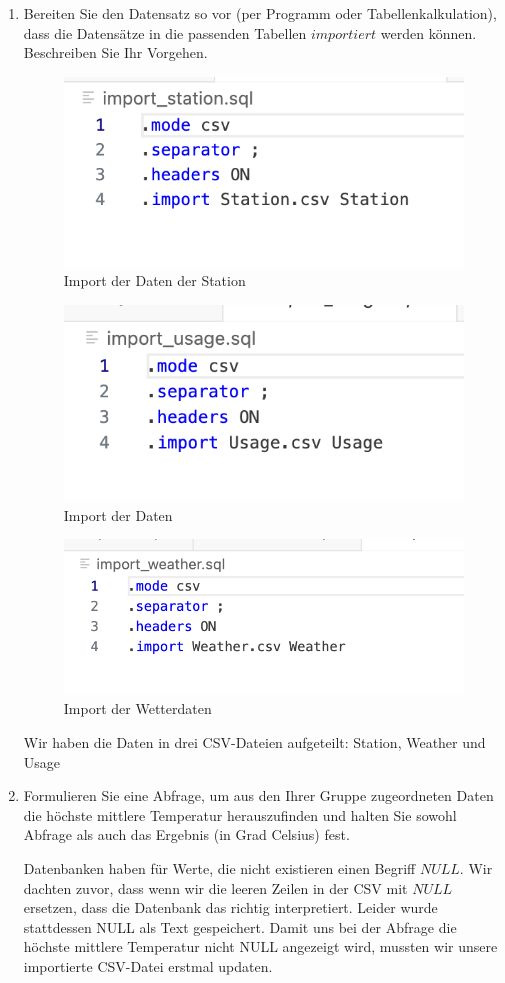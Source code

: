 \documentclass{article}
\begin{document}
\begin{enumerate}
\item Bereiten Sie den Datensatz so vor (per Programm oder Tabellenkalkulation), dass die Datensätze in die passenden Tabellen $importiert$ werden können. Beschreiben Sie Ihr Vorgehen.


\begin{figure}[h]
    \centering
    \includegraphics[width=0.5\linewidth]{import_station.png}
    \caption{Import der Daten der Station}
    \label{fig:SQL-Code2}
\end{figure}

\begin{figure}[h]
    \centering
    \includegraphics[width=0.5\linewidth]{import_usage.png}
    \caption{Import der Daten}
    \label{fig:SQL-Code3}
\end{figure}

\begin{figure}[h]
    \centering
    \includegraphics[width=0.6\linewidth]{import_weather1.png}
    \caption{Import der Wetterdaten}
    \label{fig:SQL-Code4}
\end{figure}

Wir haben die Daten in drei CSV-Dateien aufgeteilt: Station, Weather und Usage 

\item Formulieren Sie eine Abfrage, um aus den Ihrer Gruppe zugeordneten Daten die höchste mittlere Temperatur herauszufinden und halten Sie sowohl Abfrage als auch das Ergebnis (in Grad Celsius) fest. 

Datenbanken haben für Werte, die nicht existieren einen Begriff $NULL$. Wir dachten zuvor, dass wenn wir die leeren Zeilen in der CSV mit $NULL$ ersetzen, dass die Datenbank das richtig interpretiert. Leider wurde stattdessen NULL als Text gespeichert. Damit uns bei der Abfrage die höchste mittlere Temperatur nicht NULL angezeigt wird, mussten wir unsere importierte CSV-Datei erstmal updaten.
\end{enumerate}  
\end{document}
